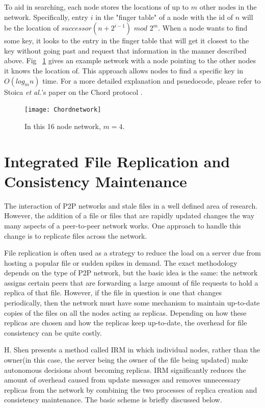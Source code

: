 \documentclass[10pt, conference, compsocconf, letterpaper]{IEEEtran} %
\begin{document}
To aid in searching, each node stores the locations of up to $m$ other nodes in the network.  Specifically, entry $i$ in the "finger table" of a node with the id of $n$ will be the location of $successor(n+2^{i-1})$ $mod$ $2^m$. When a node wants to find some key, it looks to the entry in the finger table that will get it closest to the key without going past and request that information in the manner described above.  Fig ~\ref{net} \cite{Chordpic} gives an example network with a node pointing to the other nodes it knows the location of. This approach allows nodes to find a specific key in $O(log_mn)$ time.  For a more detailed explanation and psuedocode, please refer to Stoica \emph{et al.}'s paper on the Chord protocol \cite{Chord}.

\begin{figure}
\texttt{[image: Chordnetwork]}
\caption{In this 16 node network, $m=4$.}
\label{net}
\end{figure}




\section{Integrated File Replication and Consistency Maintenance}


The interaction of P2P networks and stale files in a well defined area of research.   However, the addition of a file or files that are rapidly updated changes the way many aspects of a peer-to-peer network works.  One approach to handle this change is to replicate files across the network.

File replication is often used as a strategy to reduce the load on a server due from hosting a popular file or sudden spikes in demand.  The exact methodology depends on the type of P2P network, but the basic idea is the same: the network assigns certain peers that are forwarding a large amount of file requests to hold a replica of that file.  However, if the file in question is one that changes periodically, then the network must have some mechanism to maintain up-to-date copies of the files on all the nodes acting as replicas.  Depending on how these replicas are chosen and how the replicas keep up-to-date, the overhead for file consistency can be quite costly.

H. Shen presents a method called IRM \cite{IRM} in which individual nodes, rather than the owner(in this case, the server being the owner of the file being updated) make autonomous decisions about becoming replicas.   IRM significantly reduces the amount of overhead caused from update messages and removes unnecessary replicas from the network by combining the two processes of replica creation and consistency maintenance. The basic scheme is briefly discussed below.
\end{document}
